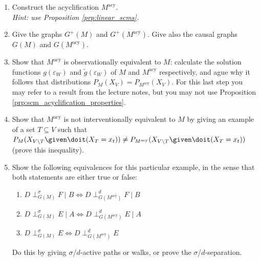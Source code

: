 \begin{enumerate}[label=11.\arabic*]
	\begin{enumerate}
		\item Construct the acyclification $M^{\text{acy}}$.\\
		\emph{Hint: use Proposition \ref*{prp:linear_scms}.}
		\item Give the graphs $G^+(M)$ and $G^+(M^{\text{acy}})$.
		Give also the causal graphs $G(M)$ and $G(M^{\text{acy}})$.
		\item Show that $M^{\text{acy}}$ is observationally equivalent to $M$: calculate the solution functions $g(\varepsilon_W)$ and $\tilde{g}(\varepsilon_W)$ of $M$ and $M^{\text{acy}}$ respectively, and ague why it follows that  distributions $P_M(X_V) = P_{M^{\text{acy}}}(X_V)$. For this last step you may refer to a result from the lecture notes, but you may not use Proposition \ref*{prp:scm_acyclification_properties}.
		\item Show that $M^{\text{acy}}$ is not interventionally equivalent to $M$ by giving an example of a set $T\subseteq V$ such that $P_M(X_{V\setminus T} \given \doit(X_T=x_t)) \neq P_{M^\text{acy}}(X_{V\setminus T} \given \doit(X_T=x_t))$ (prove this inequality).
		\item Show the following equivalences for this particular example, in the sense that both statements are either true or false:
		\begin{enumerate}
			\item $D \perp_{G(M)}^\sigma F \mid B \iff D \perp_{G(M^{\text{acy}})}^d F \mid B$
			\item $D \perp_{G(M)}^\sigma E \mid A \iff D \perp_{G(M^{\text{acy}})}^d E \mid A$
			\item $D \perp_{G(M)}^\sigma E \iff D \perp_{G(M^{\text{acy}})}^d E$
		\end{enumerate}
		Do this by giving $\sigma$/$d$-active paths or walks, or prove the $\sigma$/$d$-separation.
	\end{enumerate}


\end{enumerate}
